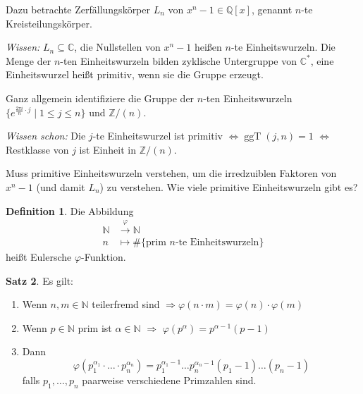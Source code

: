 \documentclass[12pt,parskip=full]{scrartcl}
\newcommand{\setN}{\mathbb{N}}
\newcommand{\setZ}{\mathbb{Z}}
\newcommand{\setQ}{\mathbb{Q}}
\newcommand{\setC}{\mathbb{C}}
\theoremstyle{definition}
\newtheorem{theorem}{Satz}[section]
\newtheorem{definition}[theorem]{Definition}
\theoremstyle{remark}
\begin{document}
	Dazu betrachte Zerfällungskörper $L_n$ von $x^n - 1 \in \setQ[x]$, genannt $n$-te Kreisteilungskörper.
	
	\textit{Wissen:} $L_n \subseteq \setC$, die Nullstellen von $x^n -1$ heißen $n$-te Einheitswurzeln. Die Menge der $n$-ten Einheitswurzeln bilden zyklische Untergruppe von $\setC^*$, eine Einheitswurzel heißt primitiv, wenn sie die Gruppe erzeugt.
	
	Ganz allgemein identifiziere die Gruppe der $n$-ten Einheitswurzeln $\{ e^{\frac{2\pi i}{n} \cdot j} \mid 1 \leq j \leq n \}$ und $\setZ/(n)$.
	
	\textit{Wissen schon:} Die $j$-te Einheitswurzel ist primitiv $\Leftrightarrow \operatorname{ggT}(j,n) = 1$ $\Leftrightarrow$ Restklasse von $j$ ist Einheit in $\setZ/(n)$.
	
	Muss primitive Einheitswurzeln verstehen, um die irredzuiblen Faktoren von $x^n -1$ (und damit $L_n$) zu verstehen. Wie viele primitive Einheitswurzeln gibt es?
	
	\begin{definition}
		Die Abbildung
		\begin{align*}
			\setN &\overset{\varphi}{\longrightarrow} \setN \\
			n &\mapsto \# \{ \text{prim $n$-te Einheitswurzeln} \}
		\end{align*}
		heißt Eulersche $\varphi$-Funktion.
	\end{definition}

	\begin{theorem}
		Es gilt:
		\begin{enumerate}
			\item Wenn $n,m \in \setN$ teilerfremd sind $\Rightarrow \varphi(n \cdot m) = \varphi(n) \cdot \varphi(m)$
			\item Wenn $p \in \setN$ prim ist $\alpha \in \setN$ $\Rightarrow$ $\varphi(p^\alpha) = p^{\alpha - 1}(p-1)$
			\item Dann
			\begin{equation*}
				\varphi(p_1^{\alpha_1} \cdot \dots \cdot p_n^{\alpha_n}) = p_1^{\alpha_1 - 1} \dots p_n^{\alpha_n - 1} (p_1 - 1) \dots (p_n - 1)
			\end{equation*}
			falls $p_1, \dots, p_n$ paarweise verschiedene Primzahlen sind.
		\end{enumerate}
	\end{theorem}
\end{document}

